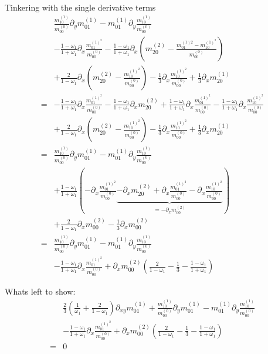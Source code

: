 \documentclass{article}
\begin{document}
Tinkering with the single derivative terms
\begin{align*}
  &
   \frac{m_{10}^{(1)}}{m_{00}^{(0)}} \partial_y m_{01}^{(1)}
  - m_{01}^{(1)} \partial_y \frac{m_{10}^{(1)}}{m_{00}^{(0)}}
  \\&
  - \frac{1 - \omega_1}{1 + \omega_1} \partial_x \frac{m_{01}^{{(1)}^2}}{m_{00}^{(0)}}
  - \frac{1 - \omega_1}{1 + \omega_1} \partial_x \left(m_{20}^{(2)} - \frac{m_{01}^{(1)2} - m_{10}^{{(1)}^2}}{m_{00}^{(0)}}\right)
  \\&
  + \frac{2}{1-\omega_1} \partial_x\left(m_{20}^{(2)} - \frac{m_{10}^{{(1)}^2}}{m_{00}^{(0)}}\right)
  - \frac{1}{3} \partial_x \frac{m_{10}^{{(1)}^2}}{m_{00}^{(0)}}
  + \frac{1}{3} \partial_x m_{20}^{(1)}
  \\=&
  - \frac{1 - \omega_1}{1 + \omega_1} \partial_x \frac{m_{01}^{{(1)}^2}}{m_{00}^{(0)}}
  - \frac{1 - \omega_1}{1 + \omega_1} \partial_x m_{20}^{(2)}
  + \frac{1 - \omega_1}{1 + \omega_1} \partial_x \frac{m_{01}^{{(1)}^2}}{m_{00}^{(0)}}
  - \frac{1 - \omega_1}{1 + \omega_1} \partial_x \frac{m_{10}^{{(1)}^2}}{m_{00}^{(0)}}
  \\&
  + \frac{2}{1-\omega_1}\partial_x \left(m_{20}^{(2)} - \frac{m_{10}^{{(1)}^2}}{m_{00}^{(0)}}\right)
  - \frac{1}{3} \partial_x \frac{m_{10}^{{(1)}^2}}{m_{00}^{(0)}}
  + \frac{1}{3} \partial_x m_{20}^{(1)}
  \\=&
   \frac{m_{10}^{(1)}}{m_{00}^{(0)}} \partial_y m_{01}^{(1)}
  - m_{01}^{(1)} \partial_y \frac{m_{10}^{(1)}}{m_{00}^{(0)}}
  \\&
  + \frac{1 - \omega_1}{1 + \omega_1}\left(
  - \partial_x \frac{m_{01}^{{(1)}^2}}{m_{00}^{(0)}}
  \underbrace{
  - \partial_x m_{20}^{(2)}
  + \partial_x \frac{m_{01}^{{(1)}^2}}{m_{00}^{(0)}}
  - \partial_x \frac{m_{10}^{{(1)}^2}}{m_{00}^{(0)}}
  }_{=-\partial_x m_{00}^{(2)}}
  \right)
  \\&
  + \frac{2}{1-\omega_1} \partial_x m_{00}^{(2)}
  - \frac{1}{3} \partial_x m_{00}^{(2)}
  \\=&
  \frac{m_{10}^{(1)}}{m_{00}^{(0)}} \partial_y m_{01}^{(1)}
  - m_{01}^{(1)} \partial_y \frac{m_{10}^{(1)}}{m_{00}^{(0)}}
  \\&
  - \frac{1 - \omega_1}{1 + \omega_1} \partial_x \frac{m_{01}^{{(1)}^2}}{m_{00}^{(0)}}
  + \partial_x m_{00}^{(2)} \left(\frac{2}{1-\omega_1} - \frac{1}{3} - \frac{1 - \omega_1}{1 + \omega_1}\right)
\end{align*}

Whats left to show:
\begin{align*}
  &
  \frac{2}{3}\left(\frac{1}{\omega_1} + \frac{2}{1-\omega_1} \right) \partial_{xy}m_{01}^{(1)} + \frac{m_{10}^{(1)}}{m_{00}^{(0)}} \partial_y m_{01}^{(1)}
  - m_{01}^{(1)} \partial_y \frac{m_{10}^{(1)}}{m_{00}^{(0)}}
  \\&
  - \frac{1 - \omega_1}{1 + \omega_1} \partial_x \frac{m_{01}^{{(1)}^2}}{m_{00}^{(0)}}
  + \partial_x m_{00}^{(2)} \left(\frac{2}{1-\omega_1} - \frac{1}{3} - \frac{1 - \omega_1}{1 + \omega_1}\right)
  \\=&0
\end{align*}
\end{document}
